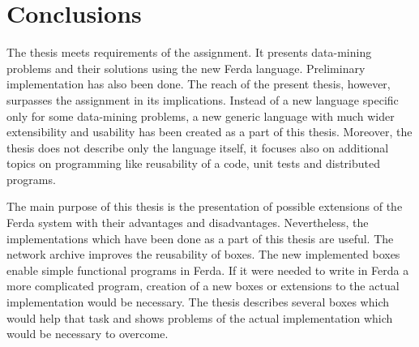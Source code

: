 \documentclass[a4paper,12pt]{book}
\begin{document}
\section{Conclusions}

The thesis meets requirements of the assignment. It presents data-mining problems and their solutions using the new Ferda language. Preliminary implementation has also been done. The reach of the present thesis, however, surpasses the assignment in its implications. Instead of a new language specific only for some data-mining problems, a new generic language with much wider extensibility and usability has been created as a part of this thesis. Moreover, the thesis does not describe only the language itself, it focuses also on additional topics on programming like reusability of a code, unit tests and distributed programs. 

The main purpose of this thesis is the presentation of possible extensions of the Ferda system with their advantages and disadvantages. Nevertheless, the implementations which have been done as a part of this thesis are useful. The network archive improves the reusability of boxes. The new implemented boxes enable simple functional programs in Ferda. If it were needed to write in Ferda a more complicated program, creation of a new boxes or extensions to the actual implementation would be necessary. The thesis describes several boxes which would help that task and shows problems of the actual implementation which would be necessary to overcome. 



%
%

%




\end{document}
